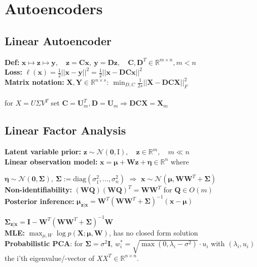 \section*{Autoencoders}
\subsection*{Linear Autoencoder}
\textbf{Def:} $\mathbf{x\mapsto z \mapsto y}, \quad \mathbf{z=Cx, \ y=Dz, \quad C,D}^T\in\mathbb R^{m\times n}, m<n$\\
\textbf{Loss:} $\ell(\mathbf x)=\frac{1}{2}||\mathbf{x-y}||^2 =\frac{1}{2}||\mathbf{x-DC x}||^2$\\
\textbf{Matrix notation:} $\mathbf{X,Y}\in\mathbb{R}^{n\times s}:\ \min_{D,C}\frac{1}{2s}||\mathbf{X-DCX}||^2_F$\\
\\
for $X = U \Sigma V^T$ set $\mathbf{C=U}_m^T, \mathbf{D=U}_m \Rightarrow \mathbf{DCX=X}_m$

\subsection*{Linear Factor Analysis}
\textbf{Latent variable prior:} $\mathbf z\sim\mathcal N(\mathbf 0,\mathrm I), \quad \mathbf z\in\mathbb R^m, \quad m \ll n$\\
\textbf{Linear observation model:} $\mathbf x=\pmb\mu+\mathbf{Wz}+\pmb\eta \in\mathbb R^n$ where

\hfill $\pmb\eta\sim\mathcal N(\mathbf 0, \pmb\Sigma),\ \pmb\Sigma:=\text{diag}(\sigma_1^2,...,\sigma_n^2)$ $\Rightarrow$ $\mathbf x\sim\mathcal N(\pmb\mu,\mathbf{WW}^T+\pmb\Sigma)$\\
\textbf{Non-identifiability:} $(\mathbf{WQ})(\mathbf{WQ})^T=\mathbf{WW}^T$ for $\mathbf Q \in O(m)$\\
\textbf{Posterior inference:} \hfill $\pmb\mu_{\mathbf{z|x}}=\mathbf W^T(\mathbf{WW}^T+\pmb\Sigma)^{-1}(\mathbf x-\pmb\mu)$

\hfill $\pmb\Sigma_{\mathbf{z|x}}=\mathbf I-\mathbf W^T(\mathbf{WW}^T+\pmb\Sigma)^{-1}\mathbf W$\\
\textbf{MLE:} $\max_{\mu, W}\log p(\mathbf X;\pmb\mu,\mathbf W)$, has no closed form solution\\
\textbf{Probabilistic PCA}: for $\pmb\Sigma=\sigma^2\mathbf I$, $w_i^* = \sqrt{\max(0, \lambda_i - \sigma^2)} \cdot u_i$
with $(\lambda_i, u_i)$ the i'th eigenvalue/-vector of $X X^T \in \mathbb{R}^{n \times n}$.
